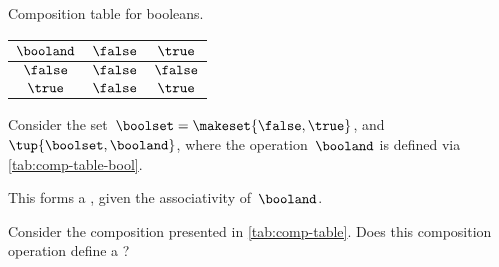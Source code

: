 \begin{margintable}
    \caption{Composition table for booleans.}
    \label{tab:comp-table-bool}
    \centering
    \begin{tabular}{c|cc}
        $\booland$ & $\false$ & $\true$ \\
        \hline
        $\false$   & $\false$ & $\false$ \\
        $\true$    & $\false$ & $\true$
    \end{tabular}
\end{margintable}

\begin{example}[Booleans]
    \label{exa:booleans-table}
    \label{ex:bool_semigroup}
    Consider the set~$\boolset=\makeset{\false, \true}$, and~$\tup{\boolset,\booland}$, where the operation~$\booland$ is defined via \cref{tab:comp-table-bool}.

    This forms a , given the associativity of~$\booland$.
\end{example}

\begin{gradedexercise}
    \label{ex:CompositionTable}
    Consider the composition presented in \cref{tab:comp-table}.
    Does this composition operation define a ?
\end{gradedexercise}

